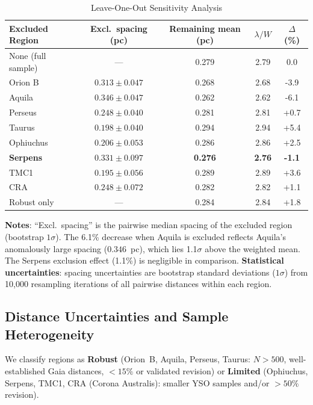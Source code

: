 \documentclass[twoside,twocolumn]{mnras}
\begin{document}
\begin{table}[h]
\caption{Leave-One-Out Sensitivity Analysis}
\label{tab:leave_one_out}
\begin{tabular}{lcccc}
\toprule
Excluded Region & Excl.\ spacing (pc) & Remaining mean (pc) & $\lambda/W$ & $\Delta$ (\%) \\
\midrule
None (full sample) & --- & 0.279 & 2.79 & 0.0 \\
Orion B & $0.313 \pm 0.047$ & 0.268 & 2.68 & -3.9 \\
Aquila & $0.346 \pm 0.047$ & 0.262 & 2.62 & -6.1 \\
Perseus & $0.248 \pm 0.040$ & 0.281 & 2.81 & +0.7 \\
Taurus & $0.198 \pm 0.040$ & 0.294 & 2.94 & +5.4 \\
Ophiuchus & $0.206 \pm 0.053$ & 0.286 & 2.86 & +2.5 \\
\textbf{Serpens} & $0.331 \pm 0.097$ & \textbf{0.276} & \textbf{2.76} & \textbf{-1.1} \\
TMC1 & $0.195 \pm 0.056$ & 0.289 & 2.89 & +3.6 \\
CRA & $0.248 \pm 0.072$ & 0.282 & 2.82 & +1.1 \\
\midrule
Robust only & --- & 0.284 & 2.84 & +1.8 \\
\bottomrule
\end{tabular}
\vspace{2pt}
\footnotesize \textbf{Notes}: ``Excl.\ spacing'' is the pairwise median spacing of the
excluded region (bootstrap $1\sigma$). The 6.1\% decrease when Aquila is excluded
reflects Aquila's anomalously large spacing ($0.346$~pc), which lies 1.1$\sigma$ above
the weighted mean. The Serpens exclusion effect (1.1\%) is negligible in comparison.
\footnotesize \textbf{Statistical uncertainties}: spacing uncertainties are bootstrap standard deviations ($1\sigma$) from 10,000 resampling iterations of all pairwise distances within each region.
\end{table}

\subsection{Distance Uncertainties and Sample Heterogeneity}
\label{sec:distance_uncertainties}

We classify regions as \textbf{Robust} (Orion~B, Aquila, Perseus, Taurus: $N>500$,
well-established Gaia distances, $<15\%$ or validated revision) or \textbf{Limited}
(Ophiuchus, Serpens, TMC1, CRA (Corona Australis): smaller YSO samples and/or $>50\%$ revision).
\end{document}
